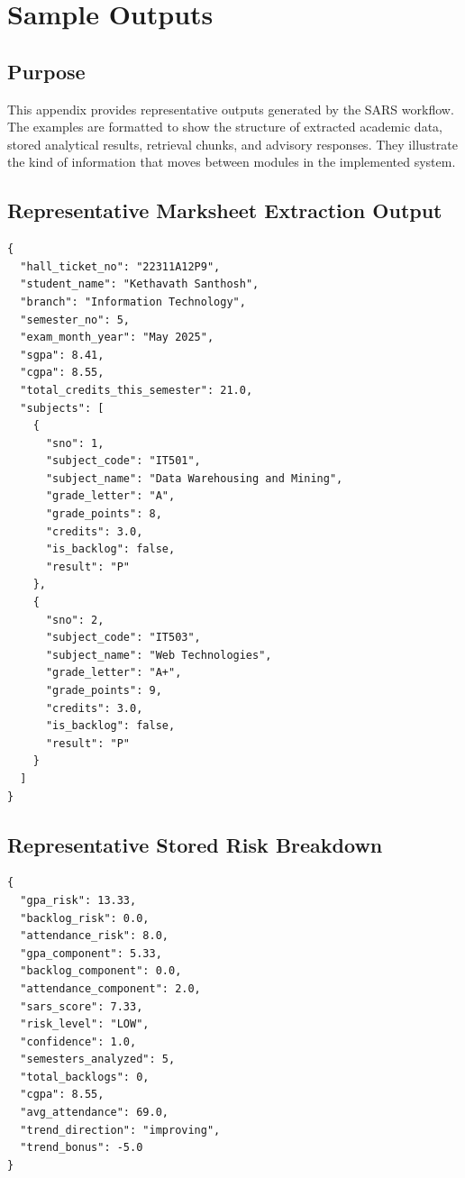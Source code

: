 \chapter{Sample Outputs}

\section{Purpose}
This appendix provides representative outputs generated by the SARS workflow. The examples are formatted to show the structure of extracted academic data, stored analytical results, retrieval chunks, and advisory responses. They illustrate the kind of information that moves between modules in the implemented system.

\section{Representative Marksheet Extraction Output}
\begin{lstlisting}[style=sarscode,caption={Illustrative Extracted Marksheet Structure}]
{
  "hall_ticket_no": "22311A12P9",
  "student_name": "Kethavath Santhosh",
  "branch": "Information Technology",
  "semester_no": 5,
  "exam_month_year": "May 2025",
  "sgpa": 8.41,
  "cgpa": 8.55,
  "total_credits_this_semester": 21.0,
  "subjects": [
    {
      "sno": 1,
      "subject_code": "IT501",
      "subject_name": "Data Warehousing and Mining",
      "grade_letter": "A",
      "grade_points": 8,
      "credits": 3.0,
      "is_backlog": false,
      "result": "P"
    },
    {
      "sno": 2,
      "subject_code": "IT503",
      "subject_name": "Web Technologies",
      "grade_letter": "A+",
      "grade_points": 9,
      "credits": 3.0,
      "is_backlog": false,
      "result": "P"
    }
  ]
}
\end{lstlisting}

\section{Representative Stored Risk Breakdown}
\begin{lstlisting}[style=sarscode,caption={Illustrative Risk Engine Output}]
{
  "gpa_risk": 13.33,
  "backlog_risk": 0.0,
  "attendance_risk": 8.0,
  "gpa_component": 5.33,
  "backlog_component": 0.0,
  "attendance_component": 2.0,
  "sars_score": 7.33,
  "risk_level": "LOW",
  "confidence": 1.0,
  "semesters_analyzed": 5,
  "total_backlogs": 0,
  "cgpa": 8.55,
  "avg_attendance": 69.0,
  "trend_direction": "improving",
  "trend_bonus": -5.0
}
\end{lstlisting}


